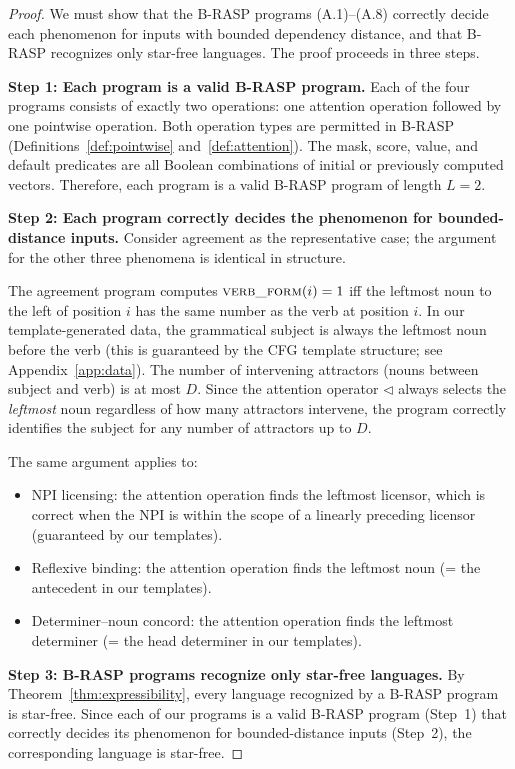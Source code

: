 \documentclass[11pt]{article}
\begin{document}
\begin{proof}
We must show that the B-RASP programs (A.1)--(A.8) correctly decide each phenomenon for inputs with bounded dependency distance, and that B-RASP recognizes only star-free languages.
The proof proceeds in three steps.

\textbf{Step 1: Each program is a valid B-RASP program.}
Each of the four programs consists of exactly two operations: one attention operation followed by one pointwise operation.
Both operation types are permitted in B-RASP (Definitions~\ref{def:pointwise} and~\ref{def:attention}).
The mask, score, value, and default predicates are all Boolean combinations of initial or previously computed vectors.
Therefore, each program is a valid B-RASP program of length $L = 2$.

\textbf{Step 2: Each program correctly decides the phenomenon for bounded-distance inputs.}
Consider agreement as the representative case; the argument for the other three phenomena is identical in structure.

The agreement program computes $\textsc{verb\_form}(i) = 1$ iff the leftmost noun to the left of position $i$ has the same number as the verb at position $i$.
In our template-generated data, the grammatical subject is always the leftmost noun before the verb (this is guaranteed by the CFG template structure; see Appendix~\ref{app:data}).
The number of intervening attractors (nouns between subject and verb) is at most $D$.
Since the attention operator $\triangleleft$ always selects the \emph{leftmost} noun regardless of how many attractors intervene, the program correctly identifies the subject for any number of attractors up to $D$.

The same argument applies to:
\begin{itemize}[itemsep=1pt,leftmargin=*]
    \item NPI licensing: the attention operation finds the leftmost licensor, which is correct when the NPI is within the scope of a linearly preceding licensor (guaranteed by our templates).
    \item Reflexive binding: the attention operation finds the leftmost noun (= the antecedent in our templates).
    \item Determiner--noun concord: the attention operation finds the leftmost determiner (= the head determiner in our templates).
\end{itemize}

\textbf{Step 3: B-RASP programs recognize only star-free languages.}
By Theorem~\ref{thm:expressibility}, every language recognized by a B-RASP program is star-free.
Since each of our programs is a valid B-RASP program (Step~1) that correctly decides its phenomenon for bounded-distance inputs (Step~2), the corresponding language is star-free.
\end{proof}
\end{document}
